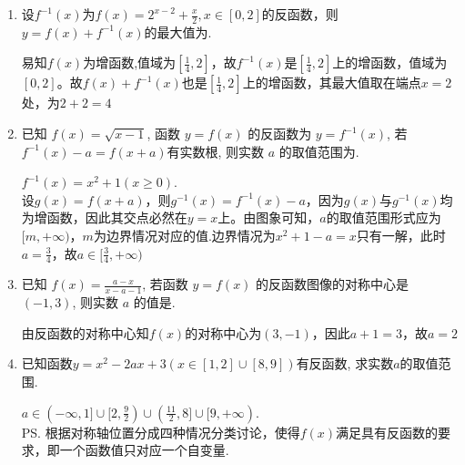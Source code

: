 \begin{enumerate}
    \begin{jieda}
     \\
    \ps 分段函数的反函数要分段求解，第二个极易错：用$y$表示$x$的过程中，遇到开方操作时要回顾定义域确定其符号
    \end{jieda}
    \item 设$f^{-1}(x)$为$f(x) = 2^{x-2} + \frac{x}{2}, x \in [0, 2]$的反函数，则$y = f(x) + f^{-1}(x)$的最大值为.
    \begin{jieda}
        易知$f(x)$为增函数,值域为$[\frac{1}{4}, 2]$，故$f^{-1}(x)$是$[\frac{1}{4}, 2]$上的增函数，值域为$[0,2]$。故$f(x) + f^{-1}(x)$也是$[\frac{1}{4}, 2]$上的增函数，其最大值取在端点$x = 2$处，为$2+2=4$
    \end{jieda}
    \item 已知 $f(x)=\sqrt{x-1}$, 函数 $y=f(x)$ 的反函数为 $y=f^{-1}(x)$, 若 $f^{-1}(x)-a=f(x+a)$有实数根, 则实数 $a$ 的取值范围为\blkda{$[\frac{3}{4}, +\infty)$}.
    \begin{jieda}
        $f^{-1}(x) = x^2 + 1 (x \geq 0)$. \\
        设$g(x) = f(x+a)$，则$g^{-1}(x) = f^{-1}(x)-a$，因为$g(x)$与$g^{-1}(x)$均为增函数，因此其交点必然在$y = x$上。由图象可知，$a$的取值范围形式应为$[m, +\infty)$，$m$为边界情况对应的值.边界情况为$x^2 + 1 - a = x$只有一解，此时$a = \frac{3}{4}$，故$a \in [\frac{3}{4}, +\infty)$
    \end{jieda}
    \item 已知 $f(x)=\frac{a-x}{x-a-1}$, 若函数 $y=f(x)$ 的反函数图像的对称中心是 $(-1,3)$, 则实数 $a$ 的值是.
    \begin{jieda}
        由反函数的对称中心知$f(x)$的对称中心为$(3, -1)$，因此$a+1 = 3$，故$a = 2$
    \end{jieda}
    \item 已知函数$y=x^2-2ax+3(x\in[1,2]\cup[8,9])$有反函数, 求实数$a$的取值范围. 
    \begin{jieda}
    $a\in(-\infty,1]\cup[2,\frac{9}{2})\cup(\frac{11}{2},8]\cup[9,+\infty)$. \\ 
    \ps 根据对称轴位置分成四种情况分类讨论，使得$f(x)$满足具有反函数的要求，即一个函数值只对应一个自变量.
    \end{jieda}


\end{enumerate}